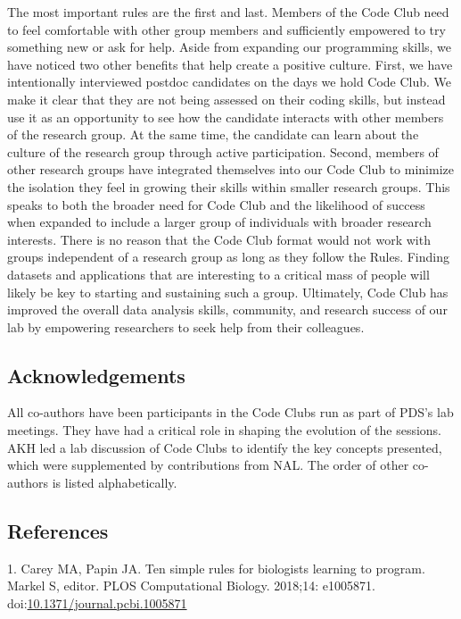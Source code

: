 \documentclass[
  11pt,
]{article}
\begin{document}
The most important rules are the first and last. Members of the Code
Club need to feel comfortable with other group members and sufficiently
empowered to try something new or ask for help. Aside from expanding our
programming skills, we have noticed two other benefits that help create
a positive culture. First, we have intentionally interviewed postdoc
candidates on the days we hold Code Club. We make it clear that they are
not being assessed on their coding skills, but instead use it as an
opportunity to see how the candidate interacts with other members of the
research group. At the same time, the candidate can learn about the
culture of the research group through active participation. Second,
members of other research groups have integrated themselves into our
Code Club to minimize the isolation they feel in growing their skills
within smaller research groups. This speaks to both the broader need for
Code Club and the likelihood of success when expanded to include a
larger group of individuals with broader research interests. There is no
reason that the Code Club format would not work with groups independent
of a research group as long as they follow the Rules. Finding datasets
and applications that are interesting to a critical mass of people will
likely be key to starting and sustaining such a group. Ultimately, Code
Club has improved the overall data analysis skills, community, and
research success of our lab by empowering researchers to seek help from
their colleagues.

\hypertarget{acknowledgements}{%
\subsection{Acknowledgements}\label{acknowledgements}}

All co-authors have been participants in the Code Clubs run as part of
PDS's lab meetings. They have had a critical role in shaping the
evolution of the sessions. AKH led a lab discussion of Code Clubs to
identify the key concepts presented, which were supplemented by
contributions from NAL. The order of other co-authors is listed
alphabetically.

\newpage

\hypertarget{references}{%
\subsection{References}\label{references}}

\hypertarget{refs}{}
\leavevmode\hypertarget{ref-Carey2018}{}%
1. Carey MA, Papin JA. Ten simple rules for biologists learning to
program. Markel S, editor. PLOS Computational Biology. 2018;14:
e1005871.
doi:\href{https://doi.org/10.1371/journal.pcbi.1005871}{10.1371/journal.pcbi.1005871}
\end{document}
